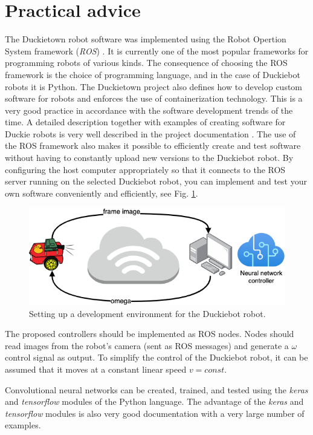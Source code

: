 \documentclass[conference]{IEEEtran}
\begin{document}
\section{Practical advice}\label{sec:practical-info}
The Duckietown robot software was implemented using the Robot Opertion System framework (\emph{ROS}) \cite{quigley2015programming}. It is currently one of the most popular frameworks for programming robots of various kinds. The consequence of choosing the ROS framework is the choice of programming language, and in the case of Duckiebot robots it is Python. The Duckietown project also defines how to develop custom software for robots and enforces the use of containerization technology. This is a very good practice in accordance with the software development trends of the time. A detailed description together with examples of creating software for Duckie robots is very well described in the project documentation \cite{Daniele:ff}. 
The use of the ROS framework also makes it possible to efficiently create and test software without having to constantly upload new versions to the Duckiebot robot. By configuring the host computer appropriately so that it connects to the ROS server running on the selected Duckiebot robot, you can implement and test your own software conveniently and efficiently, see Fig. \ref{fig:env-develop}.

\begin{figure}[h]
    \centering
    \includegraphics[width=.8\columnwidth]{controll_schema2}
    \caption{Setting up a development environment for the Duckiebot robot.}
    \label{fig:env-develop}
\end{figure}

The proposed controllers should be implemented as ROS nodes. Nodes should read images from the robot's camera (sent as ROS messages) and generate a $\omega$ control signal as output. To simplify the control of the Duckiebot robot, it can be assumed that it moves at a constant linear speed $v=const$.

Convolutional neural networks can be created, trained, and tested using the \emph{keras} and \emph{tensorflow} modules of the Python language. The advantage of the \emph{keras} and \emph{tensorflow} modules is also very good documentation with a very large number of examples. 
\end{document}
